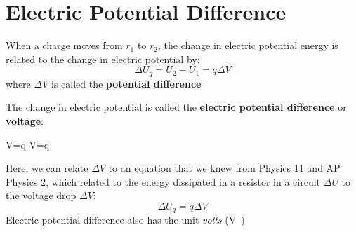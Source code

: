 \section{Electric Potential Difference}
\begin{center}
  
\end{center}
When a charge moves from $r_1$ to $r_2$, the change in electric potential
energy is related to the change in electric potential by:
\begin{equation}
  \Delta U_q=U_2-U_1=q\Delta V
\end{equation}
where $\Delta V$ is called the \textbf{potential difference}
  





The change in electric potential is called the
\textbf{electric potential difference} or \textbf{voltage}:
\begin{important-equation}
  \Delta V=q\quad{}\quad
  \dl V=q
\end{important-equation}
Here, we can relate $\Delta V$ to an equation that we knew from Physics 11
and AP Physics 2, which related to the energy dissipated in a resistor in a
circuit $\Delta U$ to the voltage drop $\Delta V$:
\begin{equation}
  \Delta U_q=q\Delta V
\end{equation}
Electric potential difference also has the unit \emph{volts} (\si\volt)




